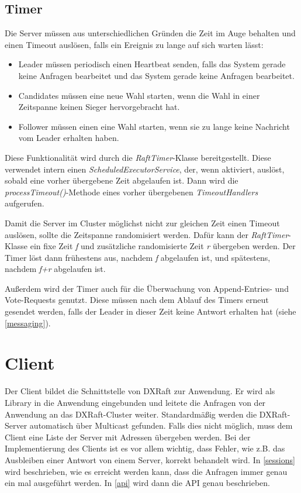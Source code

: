 \subsection{Timer}

Die Server müssen aus unterschiedlichen Gründen die Zeit im Auge behalten und einen Timeout auslösen, falls ein Ereignis zu lange auf sich warten lässt:

\begin{itemize}
	\item Leader müssen periodisch einen Heartbeat senden, falls das System gerade keine Anfragen bearbeitet und das System gerade keine Anfragen bearbeitet.
	\item Candidates müssen eine neue Wahl starten, wenn die Wahl in einer Zeitspanne keinen Sieger hervorgebracht hat.
	\item Follower müssen einen eine Wahl starten, wenn sie zu lange keine Nachricht vom Leader erhalten haben.
\end{itemize}

Diese Funktionalität wird durch die \textit{RaftTimer}-Klasse bereitgestellt. Diese verwendet intern einen \textit{ScheduledExecutorService}, der, wenn aktiviert, auslöst, sobald eine vorher übergebene Zeit abgelaufen ist. Dann wird die \textit{processTimeout()}-Methode eines vorher übergebenen \textit{TimeoutHandlers} aufgerufen. 

Damit die Server im Cluster möglichst nicht zur gleichen Zeit einen Timeout auslösen, sollte die Zeitspanne randomisiert werden. Dafür kann der \textit{RaftTimer}-Klasse ein fixe Zeit \textit{f} und zusätzliche randomisierte Zeit \textit{r} übergeben werden. Der Timer löst dann frühestens aus, nachdem \textit{f} abgelaufen ist, und spätestens, nachdem \textit{f+r} abgelaufen ist.

Außerdem wird der Timer auch für die Überwachung von Append-Entries- und Vote-Requests genutzt. Diese müssen nach dem Ablauf des Timers erneut gesendet werden, falls der Leader in dieser Zeit keine Antwort erhalten hat (siehe \ref{messaging}).

\section{Client}

Der Client bildet die Schnittstelle von DXRaft zur Anwendung. Er wird als Library in die Anwendung eingebunden und leitete die Anfragen von der Anwendung an das DXRaft-Cluster weiter. Standardmäßig werden die DXRaft-Server automatisch über Multicast gefunden. Falls dies nicht möglich, muss dem Client eine Liste der Server mit Adressen übergeben werden. Bei der Implementierung des Clients ist es vor allem wichtig, dass Fehler, wie z.B. das Ausbleiben einer Antwort von einem Server, korrekt behandelt wird. In \ref{sessions} wird beschrieben, wie es erreicht werden kann, dass die Anfragen immer genau ein mal ausgeführt werden. In \ref{api} wird dann die API genau beschrieben.

